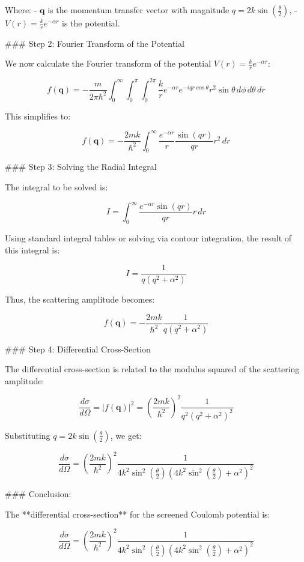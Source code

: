 Where:
- \( \mathbf{q} \) is the momentum transfer vector with magnitude \( q = 2k \sin\left(\frac{\theta}{2}\right) \),
- \( V(r) = \frac{k}{r} e^{-\alpha r} \) is the potential.

### Step 2: Fourier Transform of the Potential

We now calculate the Fourier transform of the potential \( V(r) = \frac{k}{r} e^{-\alpha r} \):

\[
f(\mathbf{q}) = -\frac{m}{2\pi \hbar^2} \int_0^\infty \int_0^\pi \int_0^{2\pi} \frac{k}{r} e^{-\alpha r} e^{-i q r \cos\theta} r^2 \sin\theta \, d\phi \, d\theta \, dr
\]

This simplifies to:

\[
f(\mathbf{q}) = -\frac{2mk}{\hbar^2} \int_0^\infty \frac{e^{-\alpha r}}{r} \frac{\sin(qr)}{qr} r^2 \, dr
\]

### Step 3: Solving the Radial Integral

The integral to be solved is:

\[
I = \int_0^\infty \frac{e^{-\alpha r} \sin(qr)}{qr} r \, dr
\]

Using standard integral tables or solving via contour integration, the result of this integral is:

\[
I = \frac{1}{q(q^2 + \alpha^2)}
\]

Thus, the scattering amplitude becomes:

\[
f(\mathbf{q}) = -\frac{2mk}{\hbar^2} \frac{1}{q(q^2 + \alpha^2)}
\]

### Step 4: Differential Cross-Section

The differential cross-section is related to the modulus squared of the scattering amplitude:

\[
\frac{d\sigma}{d\Omega} = |f(\mathbf{q})|^2 = \left( \frac{2mk}{\hbar^2} \right)^2 \frac{1}{q^2 (q^2 + \alpha^2)^2}
\]

Substituting \( q = 2k \sin\left(\frac{\theta}{2}\right) \), we get:

\[
\frac{d\sigma}{d\Omega} = \left( \frac{2mk}{\hbar^2} \right)^2 \frac{1}{4k^2 \sin^2\left(\frac{\theta}{2}\right) \left( 4k^2 \sin^2\left(\frac{\theta}{2}\right) + \alpha^2 \right)^2}
\]

### Conclusion:

The **differential cross-section** for the screened Coulomb potential is:

\[
\frac{d\sigma}{d\Omega} = \left( \frac{2mk}{\hbar^2} \right)^2 \frac{1}{4k^2 \sin^2\left(\frac{\theta}{2}\right) \left( 4k^2 \sin^2\left(\frac{\theta}{2}\right) + \alpha^2 \right)^2}
\]

